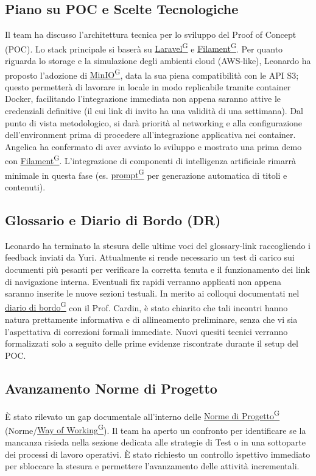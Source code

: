 \documentclass[a4paper,12pt]{article}
\providecommand{\glslink}[2]{\href{https://alittlebyte-19.github.io/Documentazione/glossario.html\#gls-#1}{\underline{#2}\textsuperscript{\scriptsize G}}}
\begin{document}
\subsection{Piano su POC e Scelte Tecnologiche}
Il team ha discusso l'architettura tecnica per lo sviluppo del Proof of Concept (POC). Lo stack principale si baserà su \glslink{laravel}{Laravel} e \glslink{filament}{Filament}. Per quanto riguarda lo storage e la simulazione degli ambienti cloud (AWS-like), Leonardo ha proposto l'adozione di \glslink{minio}{MinIO}, data la sua piena compatibilità con le API S3; questo permetterà di lavorare in locale in modo replicabile tramite container Docker, facilitando l'integrazione immediata non appena saranno attive le credenziali definitive (il cui link di invito ha una validità di una settimana).
Dal punto di vista metodologico, si darà priorità al networking e alla configurazione dell'environment prima di procedere all'integrazione applicativa nei container. Angelica ha confermato di aver avviato lo sviluppo e mostrato una prima demo con \glslink{filament}{Filament}. L'integrazione di componenti di intelligenza artificiale rimarrà minimale in questa fase (es. \glslink{prompt}{prompt} per generazione automatica di titoli e contenuti).

\subsection{Glossario e Diario di Bordo (DR)}
Leonardo ha terminato la stesura delle ultime voci del glossary-link raccogliendo i feedback inviati da Yuri. Attualmente si rende necessario un test di carico sui documenti più pesanti per verificare la corretta tenuta e il funzionamento dei link di navigazione interna. Eventuali fix rapidi verranno applicati non appena saranno inserite le nuove sezioni testuali.
In merito ai colloqui documentati nel \glslink{diario-di-bordo}{diario di bordo} con il Prof. Cardin, è stato chiarito che tali incontri hanno natura prettamente informativa e di allineamento preliminare, senza che vi sia l'aspettativa di correzioni formali immediate. Nuovi quesiti tecnici verranno formalizzati solo a seguito delle prime evidenze riscontrate durante il setup del POC.


\subsection{Avanzamento Norme di Progetto}
È stato rilevato un gap documentale all'interno delle \glslink{norme-di-progetto}{Norme di Progetto} (Norme/\glslink{way-of-working-wow}{Way of Working}). Il team ha aperto un confronto per identificare se la mancanza risieda nella sezione dedicata alle strategie di Test o in una sottoparte dei processi di lavoro operativi. È stato richiesto un controllo ispettivo immediato per sbloccare la stesura e permettere l'avanzamento delle attività incrementali.
\end{document}
